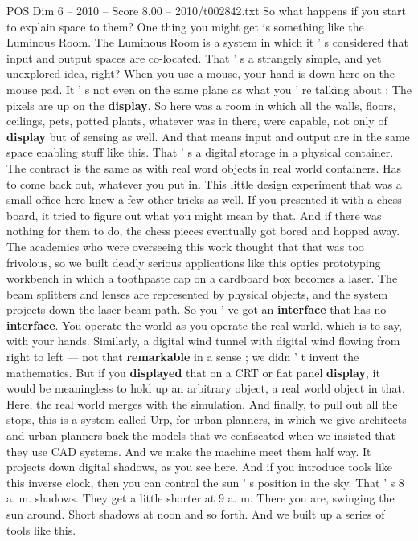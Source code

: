 \begin{textsample}{POS Dim 6 – 2010 – Score 8.00 – 2010/t002842.txt}
So what happens if you start to explain space to them?
One thing you might get is something like the Luminous Room.
The Luminous Room is a system in which it ' s considered that input and output spaces are co-located.
That ' s a strangely simple, and yet unexplored idea, right?
When you use a mouse, your hand is down here on the mouse pad.
It ' s not even on the same plane as what you ' re talking about : The pixels are up on the \textbf{display}.
So here was a room in which all the walls, floors, ceilings, pets, potted plants, whatever was in there, were capable, not only of \textbf{display} but of sensing as well.
And that means input and output are in the same space enabling stuff like this.
That ' s a digital storage in a physical container.
The contract is the same as with real word objects in real world containers.
Has to come back out, whatever you put in.
This little design experiment that was a small office here knew a few other tricks as well.
If you presented it with a chess board, it tried to figure out what you might mean by that.
And if there was nothing for them to do, the chess pieces eventually got bored and hopped away.
The academics who were overseeing this work thought that that was too frivolous, so we built deadly serious applications like this optics prototyping workbench in which a toothpaste cap on a cardboard box becomes a laser.
The beam splitters and lenses are represented by physical objects, and the system projects down the laser beam path.
So you ' ve got an \textbf{interface} that has no \textbf{interface}.
You operate the world as you operate the real world, which is to say, with your hands.
Similarly, a digital wind tunnel with digital wind flowing from right to left — not that \textbf{remarkable} in a sense ; we didn ' t invent the mathematics.
But if you \textbf{displayed} that on a CRT or flat panel \textbf{display}, it would be meaningless to hold up an arbitrary object, a real world object in that.
Here, the real world merges with the simulation.
And finally, to pull out all the stops, this is a system called Urp, for urban planners, in which we give architects and urban planners back the models that we confiscated when we insisted that they use CAD systems.
And we make the machine meet them half way.
It projects down digital shadows, as you see here.
And if you introduce tools like this inverse clock, then you can control the sun ' s position in the sky.
That ' s 8 a. m. shadows.
They get a little shorter at 9 a. m.
There you are, swinging the sun around.
Short shadows at noon and so forth.
And we built up a series of tools like this.

\end{textsample}
